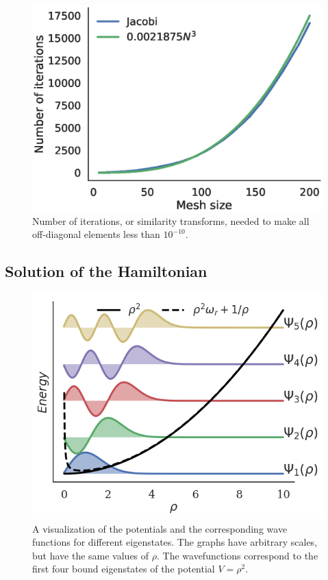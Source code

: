 \documentclass[aps,reprint]{revtex4-1}
\begin{document}
\begin{figure}[ht]
  \centering
  \includegraphics[width=\columnwidth]{figures/iterations.eps}
  \caption{\label{fig:juliaiterations} Number of iterations, or similarity
    transforms, needed to make all off-diagonal elements less than \(10^{-10}\).}
\end{figure}

\subsection{Solution of the Hamiltonian}
\label{sec:hamiltonsol}

\begin{figure}[ht]
  \centering
  \includegraphics[width=\columnwidth]{figures/wavefunctions.png}
  \caption{\label{fig:wavefunctions} A visualization of the potentials and the
    corresponding wave functions for different eigenstates. The graphs have
    arbitrary scales, but have the same values of \(\rho\). The wavefunctions
    correspond to
    the first four bound eigenstates of the potential \(V=\rho^{2}\).}
\end{figure}
\end{document}

